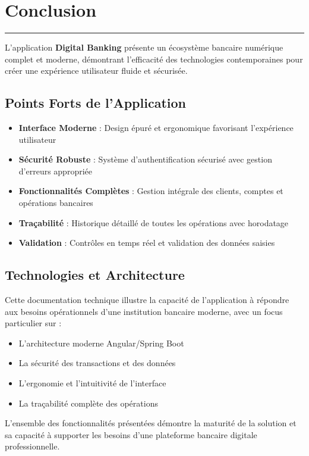 \documentclass[11pt, a4paper]{article}
\newcommand{\accentline}{\textcolor{accent}{\rule{\textwidth}{1pt}}}
\begin{document}
\section{Conclusion}
\accentline

L'application \textbf{Digital Banking} présente un écosystème bancaire numérique complet et moderne, démontrant l'efficacité des technologies contemporaines pour créer une expérience utilisateur fluide et sécurisée.

\subsection{Points Forts de l'Application}

\begin{itemize}[leftmargin=20pt, itemsep=5pt]
    \item \textbf{Interface Moderne} : Design épuré et ergonomique favorisant l'expérience utilisateur
    \item \textbf{Sécurité Robuste} : Système d'authentification sécurisé avec gestion d'erreurs appropriée
    \item \textbf{Fonctionnalités Complètes} : Gestion intégrale des clients, comptes et opérations bancaires
    \item \textbf{Traçabilité} : Historique détaillé de toutes les opérations avec horodatage
    \item \textbf{Validation} : Contrôles en temps réel et validation des données saisies
\end{itemize}

\subsection{Technologies et Architecture}

Cette documentation technique illustre la capacité de l'application à répondre aux besoins opérationnels d'une institution bancaire moderne, avec un focus particulier sur :

\begin{itemize}[leftmargin=20pt, itemsep=5pt]
    \item L'architecture moderne Angular/Spring Boot
    \item La sécurité des transactions et des données
    \item L'ergonomie et l'intuitivité de l'interface
    \item La traçabilité complète des opérations
\end{itemize}

L'ensemble des fonctionnalités présentées démontre la maturité de la solution et sa capacité à supporter les besoins d'une plateforme bancaire digitale professionnelle.
\end{document}

